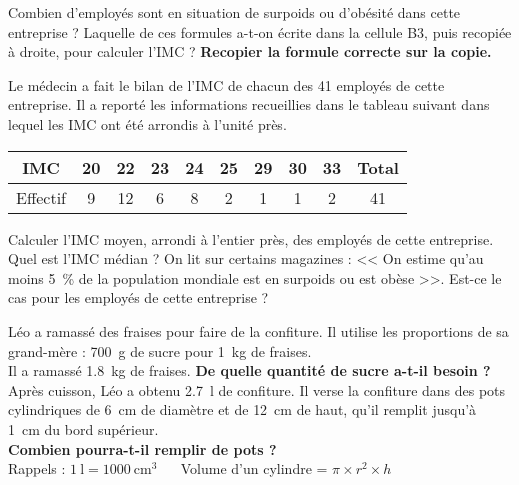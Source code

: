 \documentclass[../Cours.tex]{subfiles}
\begin{document}
\begin{questions}
\subquestion Combien d’employés sont en situation de surpoids ou d’obésité dans cette entreprise ?
\subquestion Laquelle de ces formules a-t-on écrite dans la cellule B3, puis recopiée à droite, pour calculer l’IMC ? \textbf{Recopier la formule correcte sur la copie.}

\begin{center}
    \hfill{} \hfill {} \hfill {} \hfill {}\hfill
\end{center}

\question Le médecin a fait le bilan de l’IMC de chacun des 41 employés de cette entreprise. Il a reporté les informations recueillies dans le tableau suivant dans lequel les IMC ont été arrondis à l’unité près.

\begin{center}
    \begin{tabularx}{0.8\linewidth}{|c|*{8}{C|}c|}\hline
        IMC & 20 & 22 & 23 & 24 & 25 & 29 & 30 & 33 & Total \\\hline
        Effectif & 9 & 12 & 6 & 8 & 2 & 1 & 1 & 2 & 41 \\\hline
    \end{tabularx}
\end{center}

\subquestion Calculer l’IMC moyen, arrondi à l'entier près, des employés de cette entreprise.
\subquestion Quel est l’IMC médian ? 
\subquestion On lit sur certains magazines : << On estime qu’au moins \qty{5}{\%} de la population mondiale est en surpoids ou est obèse >>. Est-ce le cas pour les employés de cette entreprise ?

Léo a ramassé des fraises pour faire de la confiture.
\question Il utilise les proportions de sa grand-mère : \qty{700}{\gram} de sucre pour \qty{1}{\kilo\gram} de fraises.\\
Il a ramassé \qty{1.8}{\kilo\gram} de fraises. \textbf{De quelle quantité de sucre a-t-il besoin ?}
\question Après cuisson, Léo a obtenu \qty{2.7}{\litre} de confiture.
Il verse la confiture dans des pots cylindriques de \qty{6}{\centi\metre} de diamètre et de \qty{12}{\centi\metre} de haut, qu’il remplit jusqu’à \qty{1}{\centi\metre} du bord supérieur.\\
\textbf{Combien pourra-t-il remplir de pots ?}\\[1ex]
Rappels : $\qty{1}{\litre}=\qty{1000}{\centi\metre\cubed}$ ~~ Volume d’un cylindre = $\pi \times r^2 \times h$

\end{questions}
\end{document}
